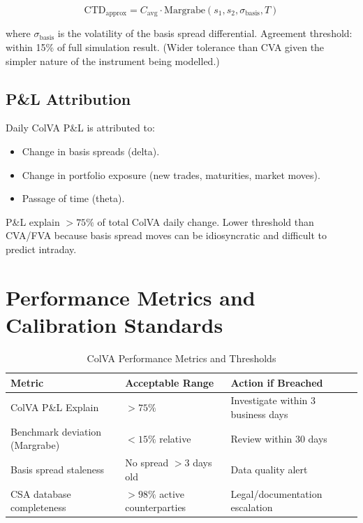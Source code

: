 \documentclass[11pt,a4paper]{article}
\begin{document}
\begin{equation}
\mathrm{CTD}_{\mathrm{approx}} = C_{\mathrm{avg}} \cdot \mathrm{Margrabe}(s_1, s_2, \sigma_{\mathrm{basis}}, T)
\tag{8}
\end{equation}

where $\sigma_{\mathrm{basis}}$ is the volatility of the basis spread differential. Agreement
threshold: within 15\% of full simulation result. (Wider tolerance than CVA given the simpler
nature of the instrument being modelled.)

\subsection{P\&L Attribution}

Daily ColVA P\&L is attributed to:
\begin{itemize}[leftmargin=*]
  \item Change in basis spreads (delta).
  \item Change in portfolio exposure (new trades, maturities, market moves).
  \item Passage of time (theta).
\end{itemize}

P\&L explain $> 75\%$ of total ColVA daily change. Lower threshold than CVA/FVA because basis
spread moves can be idiosyncratic and difficult to predict intraday.

\section{Performance Metrics and Calibration Standards}

\begin{table}[h!]
\centering
\caption{ColVA Performance Metrics and Thresholds}
\begin{tabular}{@{}lll@{}}
\toprule
\textbf{Metric} & \textbf{Acceptable Range} & \textbf{Action if Breached} \\
\midrule
ColVA P\&L Explain          & $>75\%$                  & Investigate within 3 business days \\
Benchmark deviation (Margrabe) & $<15\%$ relative      & Review within 30 days \\
Basis spread staleness       & No spread $>3$ days old  & Data quality alert \\
CSA database completeness    & $>98\%$ active counterparties & Legal/documentation escalation \\
\bottomrule
\end{tabular}
\end{table}
\end{document}
